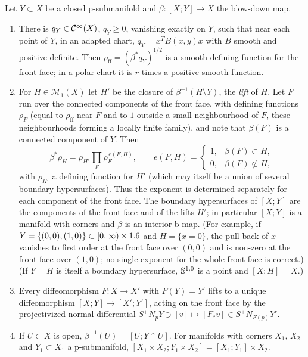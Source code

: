 \begin{proposition}\label{blowup:prop:props}
Let $Y\subset X$ be a closed p-submanifold and $\beta:[X;Y]\to X$ the blow-down map.
\begin{enumerate}[label=\textup{(\roman*)}]
\item There is $q_Y\in\mathcal{C}^\infty(X)$, $q_Y\ge0$, vanishing exactly on $Y$, such that near
each point of $Y$, in an adapted chart, $q_Y=x^TB(x,y)x$ with $B$ smooth and
positive definite. Then $\rho_{\mathrm{ff}}=(\beta^*q_Y)^{1/2}$ is a smooth defining
function for the front face; in a polar chart it is $r$ times a positive smooth function.
\item For $H\in\mathcal M_1(X)$ let $H'$ be the closure of $\beta^{-1}(H\setminus Y)$, the
\emph{lift} of $H$. Let $F$ run over the connected components of the front face, with
defining functions $\rho_F$ (equal to $\rho_{\mathrm{ff}}$ near $F$ and to $1$ outside a
small neighbourhood of $F$, these neighbourhoods forming a locally finite family), and
note that $\beta(F)$ is a connected component of $Y$. Then
\begin{equation*}
  \beta^*\rho_H=\rho_{H'}\prod_F\rho_F^{\,e(F,H)},\qquad e(F,H)=\begin{cases}1,&\beta(F)\subset H,\\
  0,&\beta(F)\not\subset H,\end{cases}
\end{equation*}
with $\rho_{H'}$ a defining function for $H'$ (which may itself be a union of several
boundary hypersurfaces). Thus the exponent is determined separately for each component of
the front face. The boundary hypersurfaces of $[X;Y]$ are the components of the front face
and of the lifts $H'$; in particular $[X;Y]$ is a manifold with corners and $\beta$ is an
interior b-map. \textup{(}For example, if $Y=\{(0,0),(1,0)\}\subset[0,\infty)\times1.6$ and
$H=\{x=0\}$, the pull-back of $x$ vanishes to first order at the front face over $(0,0)$
and is non-zero at the front face over $(1,0)$; no single exponent for the whole front
face is correct.\textup{)} \textup{(}If $Y=H$ is itself a
boundary hypersurface, $\mathbb{S}^{1,0}$ is a point and $[X;H]=X$.\textup{)}
\item Every diffeomorphism $F:X\to X'$ with $F(Y)=Y'$ lifts to a unique diffeomorphism
$[X;Y]\to[X';Y']$, acting on the front face by the projectivized normal differential
$S^+N_pY\ni[v]\mapsto[F_*v]\in S^+N_{F(p)}Y'$.
\item If $U\subset X$ is open, $\beta^{-1}(U)=[U;Y\cap U]$. For manifolds with corners
$X_1$, $X_2$ and $Y_1\subset X_1$ a p-submanifold, $[X_1\times X_2;Y_1\times X_2]=
[X_1;Y_1]\times X_2$.
\end{enumerate}
\end{proposition}
